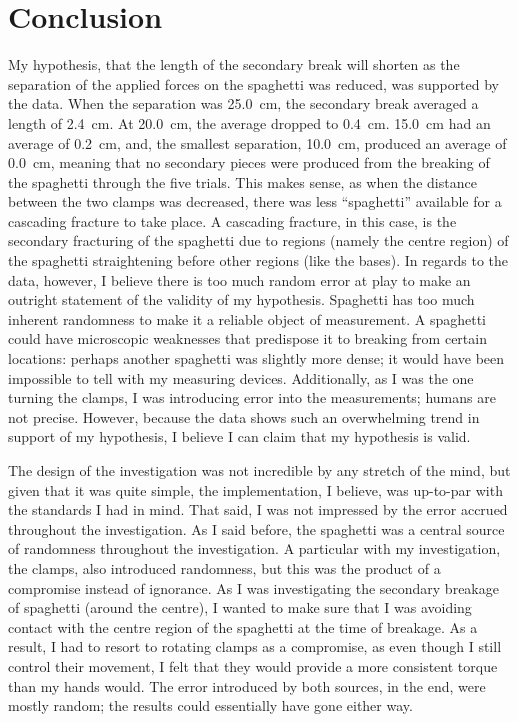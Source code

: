 \documentclass[a4paper]{article}
\begin{document}
    \section{Conclusion}
        My hypothesis, that the length of the secondary break will shorten as the separation of
        the applied forces on the spaghetti was reduced, was supported by the data. When the separation
        was \SI{25.0}{\cm}, the secondary break averaged a length of \SI{2.4}{\cm}. At \SI{20.0}{\cm},
        the average dropped to \SI{0.4}{\cm}. \SI{15.0}{\cm} had an average of \SI{0.2}{\cm}, and,
        the smallest separation, \SI{10.0}{\cm}, produced an average of \SI{0.0}{\cm}, meaning that
        no secondary pieces were produced from the breaking of the spaghetti through the five trials.
        This makes sense, as when the distance between the two clamps was decreased, there was less
        ``spaghetti'' available for a cascading fracture to take place. A cascading fracture, in this
        case, is the secondary fracturing of the spaghetti due to regions (namely the centre region)
        of the spaghetti straightening before other regions (like the bases). In regards to the data,
        however, I believe there is too much random error at play to make an outright statement of the
        validity of my hypothesis. Spaghetti has too much inherent randomness to make it a reliable
        object of measurement. A spaghetti could have microscopic weaknesses that predispose it to
        breaking from certain locations: perhaps another spaghetti was slightly more dense; it would
        have been impossible to tell with my measuring devices. Additionally, as I was the one turning
        the clamps, I was introducing error into the measurements; humans are not precise. However,
        because the data shows such an overwhelming trend in support of my hypothesis, I believe I can
        claim that my hypothesis is valid.

        The design of the investigation was not incredible by any stretch of the mind, but given that
        it was quite simple, the implementation, I believe, was up-to-par with the standards I had in
        mind. That said, I was not impressed by the error accrued throughout the investigation. As I
        said before, the spaghetti was a central source of randomness throughout the investigation.
        A particular with my investigation, the clamps, also introduced randomness, but this was the
        product of a compromise instead of ignorance. As I was investigating the secondary breakage
        of spaghetti (around the centre), I wanted to make sure that I was avoiding contact with the
        centre region of the spaghetti at the time of breakage. As a result, I had to resort to rotating
        clamps as a compromise, as even though I still control their movement, I felt that they would
        provide a more consistent torque than my hands would. The error introduced by both sources, in
        the end, were mostly random; the results could essentially have gone either way.
\end{document}
